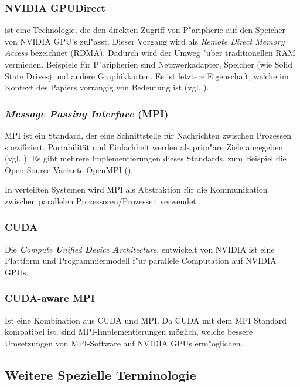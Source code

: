 \subsubsection{ NVIDIA GPUDirect }
	ist eine Technologie, die den direkten Zugriff von P"aripherie auf den Speicher von NVIDIA GPU's zul"asst. Dieser Vorgang wird als \textit{Remote Direct Memory Access} bezeichnet (RDMA).
		Dadurch wird der Umweg "uber traditionellen RAM vermieden. Beispiele für P"aripherien sind Netzwerkadapter, Speicher (wie Solid State Drives) und andere Graphikkarten. Es ist letztere Eigenschaft, welche im Kontext des Papiers vorrangig von Bedeutung ist (vgl. \cite{gpud}).

\subsubsection{ \textit{Message Passing Interface} (MPI) }
MPI ist ein Standard, der eine Schnittstelle für Nachrichten zwischen Prozessen spezifiziert. Portabilität und Einfachheit werden als prim"are Ziele angegeben (vgl. \cite[Kap. 1.1]{mpi}). Es gibt mehrere Implementierungen dieses Standards, zum Beispiel die Open-Source-Variante OpenMPI (\cite{openmpi}).

In verteilten Systemen wird MPI als Abstraktion für die Kommunikation zwischen parallelen Prozessoren/Prozessen verwendet.

\subsubsection{ CUDA }
Die \textit{\textbf{C}ompute \textbf{U}nified \textbf{D}evice \textbf{A}rchitecture}, entwickelt von NVIDIA ist eine Plattform und Programmiermodell f"ur parallele Computation auf NVIDIA GPUs. 

\subsubsection{ CUDA-aware MPI }
Ist eine Kombination aus CUDA und MPI. Da CUDA mit dem MPI Standard kompatibel ist, sind MPI-Implementierungen möglich, welche bessere Umsetzungen von MPI-Software auf NVIDIA GPUs erm"oglichen.

\subsection{Weitere Spezielle Terminologie}
